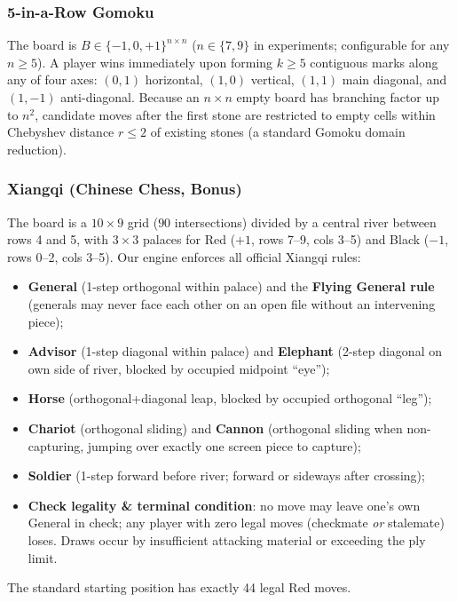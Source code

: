 \documentclass[conference]{IEEEtran}
\begin{document}
\subsubsection{5-in-a-Row Gomoku}
The board is $B \in \{-1, 0, +1\}^{n\times n}$ ($n \in \{7, 9\}$ in experiments; configurable for any $n \ge 5$). A player wins immediately upon forming $k \ge 5$ contiguous marks along any of four axes: $(0,1)$ horizontal, $(1,0)$ vertical, $(1,1)$ main diagonal, and $(1,-1)$ anti-diagonal. Because an $n\times n$ empty board has branching factor up to $n^2$, candidate moves after the first stone are restricted to empty cells within Chebyshev distance $r \le 2$ of existing stones (a standard Gomoku domain reduction).

\subsubsection{Xiangqi (Chinese Chess, Bonus)}
The board is a $10 \times 9$ grid ($90$ intersections) divided by a central river between rows 4 and 5, with $3\times 3$ palaces for Red ($+1$, rows 7--9, cols 3--5) and Black ($-1$, rows 0--2, cols 3--5). Our engine enforces all official Xiangqi rules:
\begin{itemize}
    \item \textbf{General} (1-step orthogonal within palace) and the \textbf{Flying General rule} (generals may never face each other on an open file without an intervening piece);
    \item \textbf{Advisor} (1-step diagonal within palace) and \textbf{Elephant} (2-step diagonal on own side of river, blocked by occupied midpoint ``eye'');
    \item \textbf{Horse} (orthogonal+diagonal leap, blocked by occupied orthogonal ``leg'');
    \item \textbf{Chariot} (orthogonal sliding) and \textbf{Cannon} (orthogonal sliding when non-capturing, jumping over exactly one screen piece to capture);
    \item \textbf{Soldier} (1-step forward before river; forward or sideways after crossing);
    \item \textbf{Check legality \& terminal condition}: no move may leave one's own General in check; any player with zero legal moves (checkmate \emph{or} stalemate) loses. Draws occur by insufficient attacking material or exceeding the ply limit.
\end{itemize}
The standard starting position has exactly 44 legal Red moves.
\end{document}
